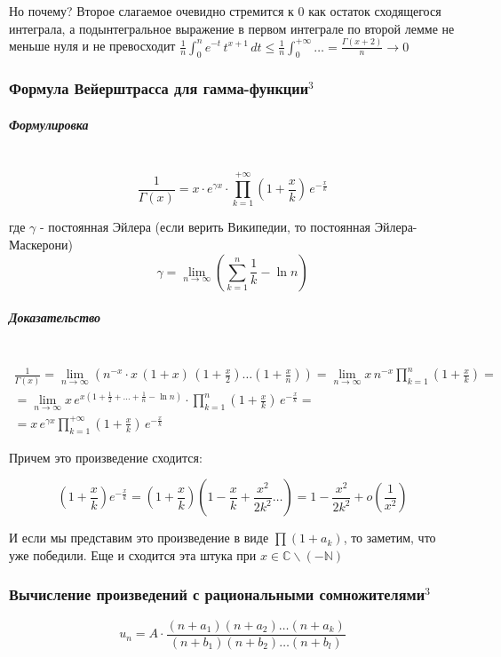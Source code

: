 \documentclass{article}
\let\vanillasubparagraph\subparagraph
\renewcommand{\subparagraph}[1]{\vanillasubparagraph{#1}\mbox{}\\}
\begin{document}
Но почему? Второе слагаемое очевидно стремится к $0$ как остаток сходящегося интеграла, а подынтегральное выражение в первом интеграле по второй лемме не меньше нуля и не превосходит $\frac{1}{n}\int_0 ^n e^{-t}\, t^{x+1}\,dt \leq \frac{1}{n} \int_0 ^{+\infty}\dots = \frac{\Gamma(x+2)}{n} \to 0$

\subsubsection{Формула Вейерштрасса для гамма-функции\texorpdfstring{$^3$}{}}

\subparagraph{Формулировка}
$$
\frac{1}{\Gamma(x)} = x \cdot e^{\gamma x} \cdot \prod_{k=1}^{+\infty} \left(1 + \frac{x}{k}\right)\,e^{-\frac{x}{k}}
$$

где $\gamma$ - постоянная Эйлера (если верить Википедии, то постоянная Эйлера-Маскерони)
$$
\gamma = \lim_{n \to \infty} \left(\sum_{k=1}^n \frac{1}{k} - \ln{n}\right)
$$

\subparagraph{Доказательство}
\begin{align*}
    \frac{1}{\Gamma(x)} = \lim_{n\to \infty}\left(n^{-x} \cdot x\,(1+x)\,\left(1 + \frac{x}{2}\right)\dots\left(1 + \frac{x}{n}\right)\right) = \lim_{n\to \infty} x \, n^{-x} \prod_{k=1}^n \left(1 + \frac{x}{k}\right) = \\ = \lim_{n\to \infty} x \, e^{x \left(1 + \frac{1}{2} + \dots + \frac{1}{n} - \ln{n}\right)} \cdot \prod_{k=1}^n \left(1 + \frac{x}{k}\right)\, e^{-\frac{x}{k}} = \\ = x\, e^{\gamma x} \prod_{k=1}^{+\infty} \left(1 + \frac{x}{k}\right)\,e^{-\frac{x}{k}}
\end{align*}

Причем это произведение сходится:

$$
\left(1 + \frac{x}{k}\right)e^{-\frac{x}{k}} = \left(1 + \frac{x}{k}\right)\left(1 - \frac{x}{k} + \frac{x^2}{2k^2} \dots\right) = 1 - \frac{x^2}{2k^2} + o\left(\frac{1}{x^2}\right)
$$

И если мы представим это произведение в виде $\prod (1+a_k)$, то заметим, что уже победили. Еще и сходится эта штука при $x \in \mathbb C \backslash (-\mathbb N)$
\subsubsection{Вычисление произведений с рациональными сомножителями\texorpdfstring{$^3$}{}}
$$
u_n = A \cdot \frac{(n + a_1)(n + a_2) \ldots (n + a_k)}{(n+b_1)(n+b_2) \ldots (n+b_l)}
$$
\end{document}
